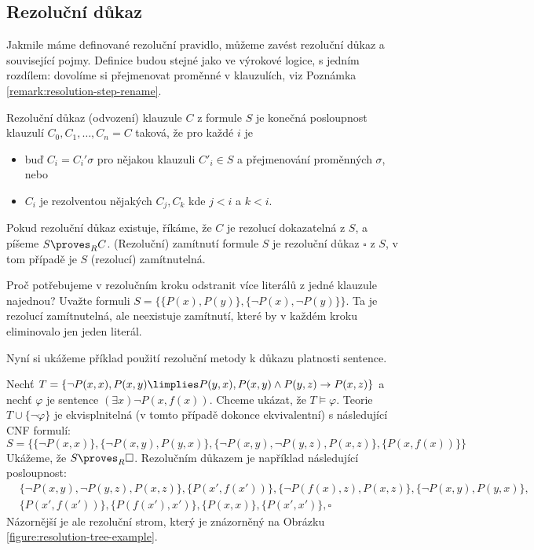\subsection{Rezoluční důkaz}

Jakmile máme definované rezoluční pravidlo, můžeme zavést \alert{rezoluční důkaz} a související pojmy. Definice budou stejné jako ve výrokové logice, s jedním rozdílem: dovolíme si přejmenovat proměnné v klauzulích, viz Poznámka \ref{remark:resolution-step-rename}.


\begin{definition}
    \alert{Rezoluční důkaz (odvození)} klauzule $C$ z formule $S$ je \alert{konečná} posloupnost klauzulí $C_0,C_1,\dots,C_n=C$
    taková, že pro každé $i$ je 
    \begin{itemize}
        \item buď $C_i=C_i'\sigma$ pro nějakou klauzuli $C'_i\in S$ a přejmenování proměnných $\sigma$, nebo
        \item $C_i$ je rezolventou nějakých $C_j,C_k$ kde $j<i$ a $k<i$.
    \end{itemize}
    Pokud rezoluční důkaz existuje, říkáme, že $C$ je \alert{rezolucí dokazatelná} z $S$, a píšeme $S\proves_R C$. \alert{(Rezoluční) zamítnutí} formule $S$ je rezoluční důkaz $\square$ z $S$, v tom případě je $S$ \alert{(rezolucí) zamítnutelná}.
\end{definition}

\begin{remark}
    Proč potřebujeme v rezolučním kroku odstranit více literálů z jedné klauzule najednou? Uvažte formuli $S=\{\{P(x),P(y)\},\{\neg P(x),\neg P(y)\}\}$. Ta je rezolucí zamítnutelná, ale neexistuje zamítnutí, které by v každém kroku eliminovalo jen jeden literál.
\end{remark}

Nyní si ukážeme příklad použití rezoluční metody k důkazu platnosti sentence.

\begin{example}\label{example:resolution-proof-predicate}
Nechť $T=\{\neg P(x,x),P(x,y) \limplies P(y,x), P(x,y)\land P(y,z)\to P(x,z)\}$ a nechť $\varphi$ je sentence $(\exists x)\neg P(x,f(x))$. Chceme ukázat, že $T\models\varphi$. Teorie $T\cup\{\neg\varphi\}$ je ekvisplnitelná (v tomto případě dokonce ekvivalentní) s následující CNF formulí:
$$S=\{\{\neg P(x,x)\},\{\neg P(x,y),P(y,x)\},\{\neg P(x,y),\neg P(y,z), P(x,z)\},\{P(x,f(x))\}\}$$
Ukážeme, že $S\proves_R\square$. Rezolučním důkazem je například následující posloupnost:
\begin{align*}
    &\{\neg P(x,y),\neg P(y,z), P(x,z)\},
    \{P(x',f(x'))\},
    \{\neg P(f(x),z),P(x,z)\},
    \{\neg P(x,y),P(y,x)\},\\
    &\{P(x',f(x'))\},
    \{P(f(x'),x')\},
    \{P(x,x)\},
    \{P(x',x')\},
    \square   
\end{align*}
Názornější je ale rezoluční strom, který je znázorněný na Obrázku \ref{figure:resolution-tree-example}.
\end{example}


